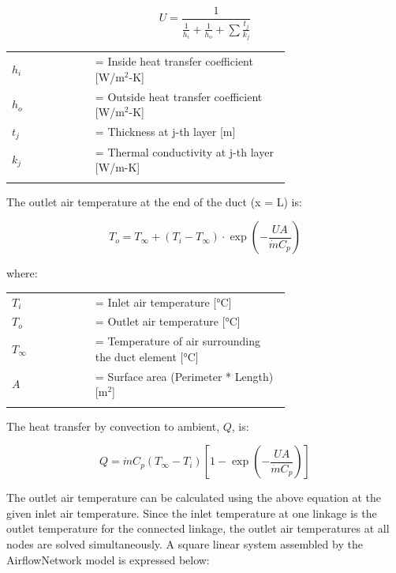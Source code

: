 \begin{equation}
U = \frac{1}{{\frac{1}{{{h_i}}} + \frac{1}{{{h_o}}} + \sum {\frac{{{t_j}}}{{{k_j}}}} }}
\end{equation}

\begin{tabular}{lp{0.7\linewidth}}
\\
$h_i$ &= Inside heat transfer coefficient [W/m\(^{2}\)-K]\\
$h_o$ &= Outside heat transfer coefficient [W/m\(^{2}\)-K]\\
$t_j$ &= Thickness at j-th layer [m]\\
$k_j$ &= Thermal conductivity at j-th layer [W/m-K]\\
\\
\end{tabular}

The outlet air temperature at the end of the duct (x = L) is:

\begin{equation}
T_o = T_\infty + (T_i - T_\infty) \cdot \exp \left(- \frac{UA}{\dot{m} C_p} \right)
\end{equation}

where:

\begin{tabular}{lp{0.7\linewidth}}
\\
$T_i$ &= Inlet air temperature [°C]\\
$T_o$ &= Outlet air temperature [°C]\\
$T_\infty$ &= Temperature of air surrounding the duct element [°C]\\
$A$ &= Surface area (Perimeter * Length) [m\(^{2}\)]\\
\\
\end{tabular}

The heat transfer by convection to ambient, $Q$, is:

\begin{equation}
Q = \dot{m} {C_p}(T_\infty- T_i)\left[1 - \exp \left( - \frac{UA}{\dot{m} C_p} \right) \right]
\end{equation}

The outlet air temperature can be calculated using the above equation at the given inlet air temperature. Since the inlet temperature at one linkage is the outlet temperature for the connected linkage, the outlet air temperatures at all nodes are solved simultaneously. A square linear system assembled by the AirflowNetwork model is expressed below:

